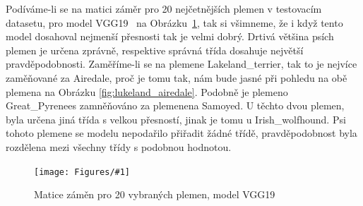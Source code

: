 \documentclass[a4paper,12pt]{article}
\newcommand{\image}[4]{\begin{figure}[ht!] \centering \texttt{[image: Figures/\#1]} \caption{#2} \label{#3} \end{figure}}
\begin{document}
Podíváme-li se na matici záměr pro 20 nejčetnějších plemen v testovacím datasetu, pro model VGG19~\cite{vgg19} na Obrázku~\ref{fig:vgg19_conf_mat}, tak si všimneme, 
že i když tento model dosahoval nejmenší přesnosti tak je velmi dobrý. Drtivá většina psích plemen je určena zprávně, respektive správná třída dosahuje 
největší pravděpodobnosti. Zaměříme-li se na plemene Lakeland\_terrier, tak to je nejvíce zaměňované za Airedale, proč je tomu tak, nám bude jasné při pohledu na 
obě plemena na Obrázku \ref{fig:lukeland_airedale}. Podobně je plemeno Great\_Pyrenees zamněňováno za plemenena Samoyed. U těchto dvou plemen, byla určena jiná 
třída s velkou přesností, jinak je tomu u Irish\_wolfhound. Psi tohoto plemene se modelu nepodařilo přiřadit žádné třídě, pravděpodobnost byla rozdělena mezi všechny třídy s
podobnou hodnotou.

\image{vgg19_confmat.pdf}{Matice záměn pro 20 vybraných plemen, model VGG19}{fig:vgg19_conf_mat}{1.0}
\end{document}
